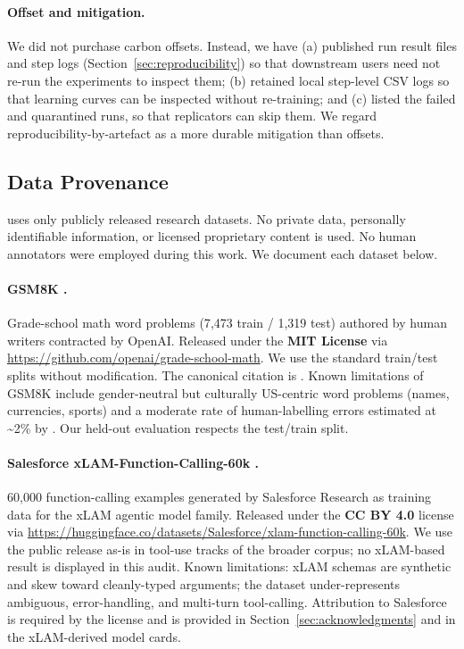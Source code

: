 \paragraph{Offset and mitigation.}
We did not purchase carbon offsets. Instead, we have (a) published run
result files and step logs (Section~\ref{sec:reproducibility}) so that
downstream users need not re-run the experiments to inspect them; (b) retained local step-level CSV logs so that
learning curves can be inspected without re-training; and (c) listed the failed and quarantined runs, so that
replicators can skip them. We regard reproducibility-by-artefact as a
more durable mitigation than offsets.

\subsection{Data Provenance}
\label{sec:provenance}

\ours{} uses only publicly released research datasets. No private data,
personally identifiable information, or licensed proprietary content is
used. No human annotators were employed during this work. We document
each dataset below.

\paragraph{GSM8K \cite{cobbe2021training}.}
Grade-school math word problems (7{,}473 train / 1{,}319 test)
authored by human writers contracted by OpenAI. Released under the
\textbf{MIT License} via \url{https://github.com/openai/grade-school-math}.
We use the standard train/test splits without modification. The canonical
citation is \citet{cobbe2021training}. Known limitations of GSM8K include
gender-neutral but culturally US-centric word problems (names, currencies,
sports) and a moderate rate of human-labelling errors estimated at
\textasciitilde 2\% by \cite{zhang2024gsm1k}. Our held-out evaluation
respects the test/train split.

\paragraph{Salesforce xLAM-Function-Calling-60k \cite{liu2024xlam}.}
60{,}000 function-calling examples generated by Salesforce Research as
training data for the xLAM agentic model family. Released under the
\textbf{CC BY 4.0} license via \url{https://huggingface.co/datasets/Salesforce/xlam-function-calling-60k}.
We use the public release as-is in tool-use tracks of the broader corpus; no
xLAM-based result is displayed in this audit.
Known limitations: xLAM schemas are synthetic and skew toward cleanly-typed
arguments; the dataset under-represents ambiguous, error-handling, and
multi-turn tool-calling. Attribution to Salesforce is required by the
license and is provided in Section~\ref{sec:acknowledgments} and in the
xLAM-derived model cards.

